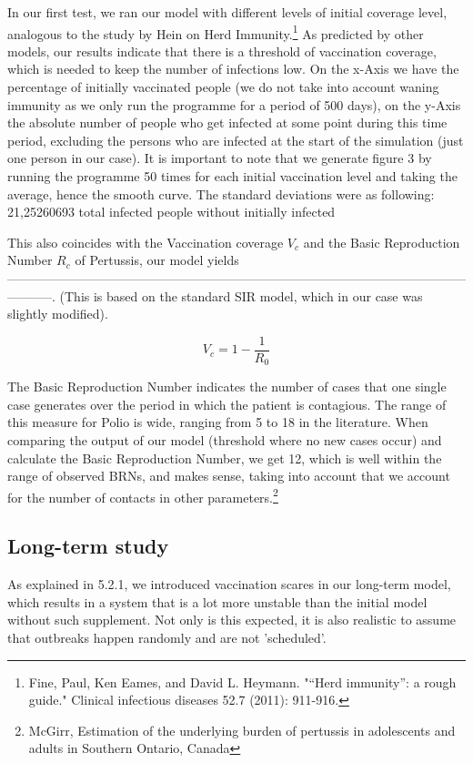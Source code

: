 \documentclass[11pt]{article}
\begin{document}
In our first test, we ran our model with different levels of initial coverage level, analogous to the study by Hein on Herd Immunity.\footnote{Fine, Paul, Ken Eames, and David L. Heymann. "“Herd immunity”: a rough guide." Clinical infectious diseases 52.7 (2011): 911-916.} As predicted by other models, our results indicate that there is a threshold of vaccination coverage, which is needed to keep the number of infections low. On the x-Axis we have the percentage of initially vaccinated people (we do not take into account waning immunity as we only run the programme for a period of 500 days), on the y-Axis the absolute number of people who get infected at some point during this time period, excluding the persons who are infected at the start of the simulation (just one person in our case). It is important to note that we generate figure 3 by running the programme 50 times for each initial vaccination level and taking the average, hence the smooth curve. The standard deviations were as following: 21,25260693
 total infected people without initially infected

This also coincides with the Vaccination coverage $V_{c}$ and the Basic Reproduction Number $R_{c}$ of Pertussis, our model yields -----------------------------------------------------------------------------------------------------------------------. (This is based on the standard SIR model, which in our case was slightly modified). 

\begin{equation}
V_{c} = 1-\dfrac{1}{R_{0}}
\end{equation}

The Basic Reproduction Number indicates the number of cases that one single case generates over the period in which the patient is contagious. The range of this measure for Polio is wide, ranging from 5 to 18 in the literature. When comparing the output of our model (threshold where no new cases occur) and calculate the Basic Reproduction Number, we get 12, which is well within the range of observed BRNs, and makes sense, taking into account that we account for the number of contacts in other parameters.\footnote{McGirr, Estimation of the underlying burden of pertussis in adolescents and adults in Southern Ontario, Canada} 




\subsection{Long-term study}
As explained in 5.2.1, we introduced vaccination scares in our long-term model, which results in a system that is a lot more unstable than the initial model without such supplement. Not only is this expected, it is also realistic to assume that outbreaks happen randomly and are not 'scheduled'. 
\end{document}

